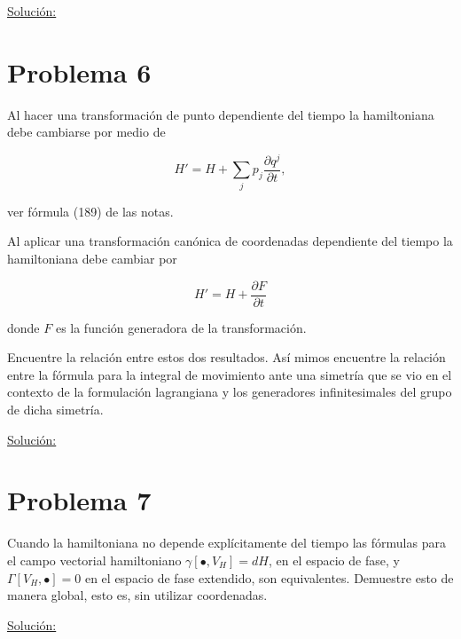\documentclass[a4paper,10pt]{article}
\numberwithin{equation}{section}
\begin{document}
\vspace{.3cm}

\underline{Solución:} \vspace{.3cm}

\section{Problema 6}

Al hacer una transformación de punto dependiente del tiempo la hamiltoniana 
debe cambiarse por medio de 

$$
H' = H + \sum_j p_j \frac{\partial q^j}{\partial t},
$$

ver fórmula (189) de las notas.

\vspace{.3cm}

Al aplicar una transformación canónica de coordenadas dependiente del tiempo la 
hamiltoniana debe cambiar por 

$$
H' = H + \frac{\partial F}{\partial t}
$$

donde $F$ es la función generadora de la transformación. 

\vspace{.3cm}

Encuentre la relación entre estos dos resultados. Así mimos encuentre la relación 
entre la fórmula para la integral de movimiento ante una simetría que se vio en el 
contexto de la formulación lagrangiana y los generadores infinitesimales del grupo 
de dicha simetría.

\vspace{.3cm}

\underline{Solución:} \vspace{.3cm}

\section{Problema 7}

Cuando la hamiltoniana no depende explícitamente del tiempo las fórmulas para el 
campo vectorial hamiltoniano $\gamma[\bullet,V_H] = dH$, en el espacio de fase, 
y $\Gamma[V_H,\bullet] = 0$ en el espacio de fase extendido, son equivalentes. 
Demuestre esto de manera global, esto es, sin utilizar coordenadas.

\vspace{.3cm}

\underline{Solución:} \vspace{.3cm}
\end{document}
